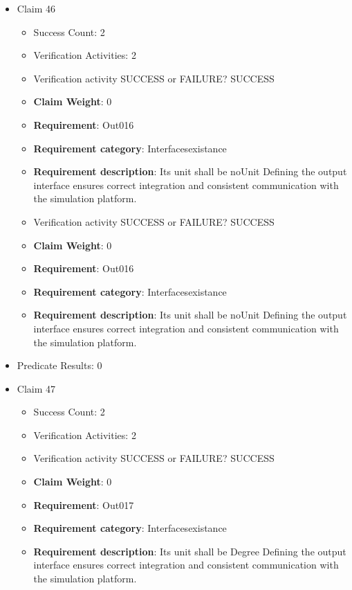 \documentclass{article}
\begin{document}
\begin{itemize}
  				  \item Claim 46
				\begin{itemize}
			    	\item Success Count: 2 
			    	\item Verification Activities: 2
					\item Verification activity SUCCESS or FAILURE? SUCCESS
					\item \textbf{Claim Weight}: 0
						\item \textbf{Requirement}: Out016 
						\item \textbf{Requirement category}: Interfacesexistance 
						\item \textbf{Requirement description}: Its unit shall be noUnit Defining the output interface ensures correct integration and consistent communication with the simulation platform.
					
					\item Verification activity SUCCESS or FAILURE? SUCCESS
					\item \textbf{Claim Weight}: 0
						\item \textbf{Requirement}: Out016 
						\item \textbf{Requirement category}: Interfacesexistance 
						\item \textbf{Requirement description}: Its unit shall be noUnit Defining the output interface ensures correct integration and consistent communication with the simulation platform.
					
				\end{itemize}
				
									    
				\item Predicate Results: 0

  				  \item Claim 47
				\begin{itemize}
			    	\item Success Count: 2 
			    	\item Verification Activities: 2
					\item Verification activity SUCCESS or FAILURE? SUCCESS
					\item \textbf{Claim Weight}: 0
						\item \textbf{Requirement}: Out017 
						\item \textbf{Requirement category}: Interfacesexistance 
						\item \textbf{Requirement description}: Its unit shall be Degree Defining the output interface ensures correct integration and consistent communication with the simulation platform.
					

\end{itemize}
\end{itemize}
\end{document}
